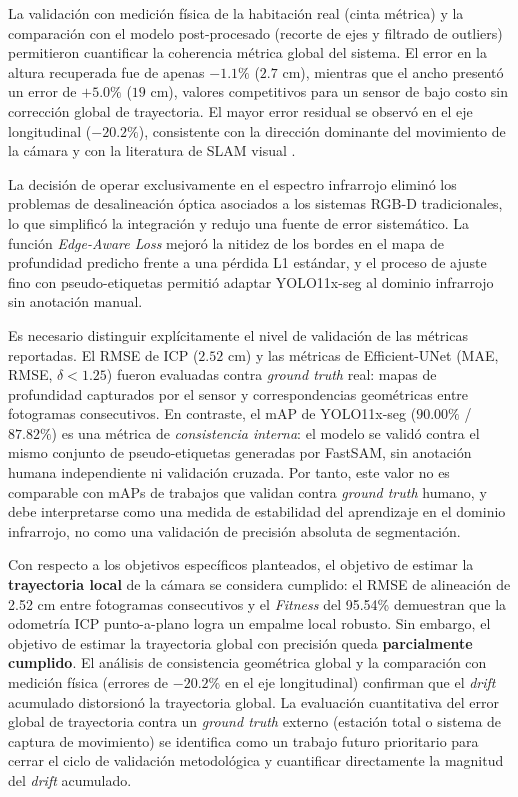 \documentclass[12pt, a4, twoside, openany]{report}
\begin{document}
La validación con medición física de la habitación real (cinta métrica) y la comparación con el modelo post-procesado (recorte de ejes y filtrado de outliers) permitieron cuantificar la coherencia métrica global del sistema. El error en la altura recuperada fue de apenas $-1.1\%$ ($2.7$ cm), mientras que el ancho presentó un error de $+5.0\%$ ($19$ cm), valores competitivos para un sensor de bajo costo sin corrección global de trayectoria. El mayor error residual se observó en el eje longitudinal ($-20.2\%$), consistente con la dirección dominante del movimiento de la cámara y con la literatura de SLAM visual \cite{sahili2023survey}.

La decisión de operar exclusivamente en el espectro infrarrojo eliminó los problemas de desalineación óptica asociados a los sistemas RGB-D tradicionales, lo que simplificó la integración y redujo una fuente de error sistemático. La función \textit{Edge-Aware Loss} mejoró la nitidez de los bordes en el mapa de profundidad predicho frente a una pérdida L1 estándar, y el proceso de ajuste fino con pseudo-etiquetas permitió adaptar YOLO11x-seg al dominio infrarrojo sin anotación manual.

Es necesario distinguir explícitamente el nivel de validación de las métricas reportadas. El RMSE de ICP ($2.52$ cm) y las métricas de Efficient-UNet (MAE, RMSE, $\delta < 1.25$) fueron evaluadas contra \textit{ground truth} real: mapas de profundidad capturados por el sensor y correspondencias geométricas entre fotogramas consecutivos. En contraste, el mAP de YOLO11x-seg ($90.00\%$ / $87.82\%$) es una métrica de \textit{consistencia interna}: el modelo se validó contra el mismo conjunto de pseudo-etiquetas generadas por FastSAM, sin anotación humana independiente ni validación cruzada. Por tanto, este valor no es comparable con mAPs de trabajos que validan contra \textit{ground truth} humano, y debe interpretarse como una medida de estabilidad del aprendizaje en el dominio infrarrojo, no como una validación de precisión absoluta de segmentación.

Con respecto a los objetivos específicos planteados, el objetivo de estimar la \textbf{trayectoria local} de la cámara se considera cumplido: el RMSE de alineación de 2.52 cm entre fotogramas consecutivos y el \textit{Fitness} del 95.54\% demuestran que la odometría ICP punto-a-plano logra un empalme local robusto. Sin embargo, el objetivo de estimar la trayectoria global con precisión queda \textbf{parcialmente cumplido}. El análisis de consistencia geométrica global y la comparación con medición física (errores de $-20.2\%$ en el eje longitudinal) confirman que el \textit{drift} acumulado distorsionó la trayectoria global. La evaluación cuantitativa del error global de trayectoria contra un \textit{ground truth} externo (estación total o sistema de captura de movimiento) se identifica como un trabajo futuro prioritario para cerrar el ciclo de validación metodológica y cuantificar directamente la magnitud del \textit{drift} acumulado.
\end{document}
